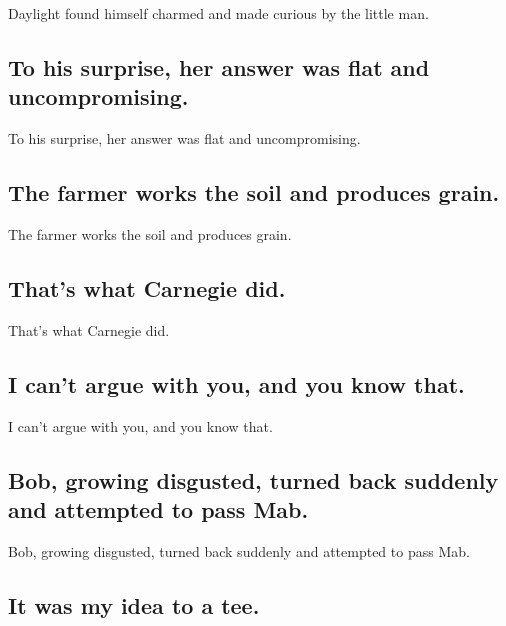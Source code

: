 \documentclass[]{article}
\begin{document}
Daylight found himself charmed and made curious by the little man.

\hypertarget{to-his-surprise-her-answer-was-flat-and-uncompromising.}{%
\subsection{To his surprise, her answer was flat and
uncompromising.}\label{to-his-surprise-her-answer-was-flat-and-uncompromising.}}

To his surprise, her answer was flat and uncompromising.

\hypertarget{the-farmer-works-the-soil-and-produces-grain.}{%
\subsection{The farmer works the soil and produces
grain.}\label{the-farmer-works-the-soil-and-produces-grain.}}

The farmer works the soil and produces grain.

\hypertarget{thats-what-carnegie-did.}{%
\subsection{That's what Carnegie did.}\label{thats-what-carnegie-did.}}

That's what Carnegie did.

\hypertarget{i-cant-argue-with-you-and-you-know-that.}{%
\subsection{I can't argue with you, and you know
that.}\label{i-cant-argue-with-you-and-you-know-that.}}

I can't argue with you, and you know that.

\hypertarget{bob-growing-disgusted-turned-back-suddenly-and-attempted-to-pass-mab.}{%
\subsection{Bob, growing disgusted, turned back suddenly and attempted
to pass
Mab.}\label{bob-growing-disgusted-turned-back-suddenly-and-attempted-to-pass-mab.}}

Bob, growing disgusted, turned back suddenly and attempted to pass Mab.

\hypertarget{it-was-my-idea-to-a-tee.}{%
\subsection{It was my idea to a tee.}\label{it-was-my-idea-to-a-tee.}}
\end{document}

